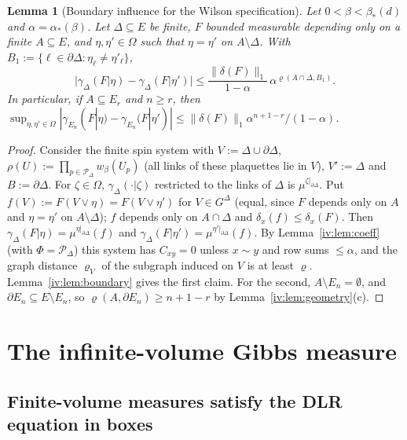 \documentclass[11pt,a4paper]{article}
\newtheorem{lemma}[theorem]{Lemma}
\theoremstyle{definition}
\theoremstyle{remark}
\newcommand{\cP}{\mathcal{P}}
\newcommand{\norm}[1]{\lVert #1\rVert}
\newcommand{\aS}{\alpha_*}
\newcommand{\bS}{\beta_*}
\begin{document}
\begin{lemma}[Boundary influence for the Wilson specification]\label{iv:lem:boundaryWilson}
Let $0<\beta<\bS(d)$ and $\alpha=\aS(\beta)$. Let $\Delta\subseteq E$ be finite, $F$ bounded measurable depending only on a finite
$A\subseteq E$, and $\eta,\eta'\in\Omega$ such that $\eta=\eta'$ on $A\setminus\Delta$. With
$B_1:=\{\ell\in\partial\Delta:\eta_\ell\ne\eta'_\ell\}$,
\[
\bigl|\gamma_\Delta(F|\eta)-\gamma_\Delta(F|\eta')\bigr|\le\frac{\norm{\delta(F)}_1}{1-\alpha}\,\alpha^{\varrho(A\cap\Delta,B_1)} .
\]
In particular, if $A\subseteq E_r$ and $n\ge r$, then
$\sup_{\eta,\eta'\in\Omega}|\gamma_{E_n}(F|\eta)-\gamma_{E_n}(F|\eta')|\le\norm{\delta(F)}_1\alpha^{n+1-r}/(1-\alpha)$.
\end{lemma}

\begin{proof}
Consider the finite spin system with $V:=\Delta\cup\partial\Delta$, $\rho(U):=\prod_{p\in\cP_\Delta}w_\beta(U_p)$ (all links of
these plaquettes lie in $V$), $V':=\Delta$ and $B:=\partial\Delta$. For $\zeta\in\Omega$, $\gamma_\Delta(\cdot|\zeta)$ restricted to
the links of $\Delta$ is $\mu^{\zeta|_{\partial\Delta}}$. Put $f(V):=F(V\vee\eta)=F(V\vee\eta')$ for $V\in G^\Delta$ (equal, since $F$
depends only on $A$ and $\eta=\eta'$ on $A\setminus\Delta$); $f$ depends only on $A\cap\Delta$ and $\delta_x(f)\le\delta_x(F)$.
Then $\gamma_\Delta(F|\eta)=\mu^{\eta|_{\partial\Delta}}(f)$ and $\gamma_\Delta(F|\eta')=\mu^{\eta'|_{\partial\Delta}}(f)$. By
Lemma~\ref{iv:lem:coeff} (with $\Phi=\cP_\Delta$) this system has $C_{xy}=0$ unless $x\sim y$ and row sums $\le\alpha$, and the
graph distance $\varrho_V$ of the subgraph induced on $V$ is at least $\varrho$. Lemma~\ref{iv:lem:boundary} gives the first
claim. For the second, $A\setminus E_n=\emptyset$, and $\partial E_n\subseteq E\setminus E_n$, so
$\varrho(A,\partial E_n)\ge n+1-r$ by Lemma~\ref{iv:lem:geometry}(c).
\end{proof}

\section{The infinite-volume Gibbs measure}\label{iv:sec:gibbs}

\subsection{Finite-volume measures satisfy the DLR equation in boxes}
\end{document}
